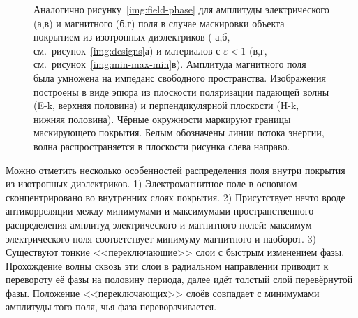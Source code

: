 \begin{figure}[p]
  \begin{minipage}[ht]{0.495\linewidth}
  \end{minipage}
  \hfill
  \begin{minipage}[ht]{0.495\linewidth}
  \end{minipage}
  \begin{minipage}[ht]{0.495\linewidth}
  \end{minipage}
  \hfill
  \begin{minipage}[ht]{0.495\linewidth}
  \end{minipage}

  \caption{Аналогично рисунку~\ref{img:field-phase} для амплитуды
    электрического (а,в) и магнитного (б,г) поля в случае маскировки
    объекта покрытием из изотропных диэлектриков ( а,б,
    см.~рисунок~\ref{img:designs}а) и материалов с
    ${\varepsilon <1}$ (в,г,
    см.~рисунок~\ref{img:min-max-min}в). Амплитуда магнитного поля
    была умножена на импеданс свободного пространства. Изображения
    построены в виде эпюра из плоскости поляризации падающей волны
    (E-k, верхняя половина) и перпендикулярной плоскости (H-k, нижняя
    половина). Чёрные окружности маркируют границы маскирующего
    покрытия. Белым обозначены линии потока энергии, волна
    распространяется в плоскости рисунка слева направо.}
  \label{img:field-amplitude}
\end{figure}

Можно отметить несколько особенностей распределения поля внутри
покрытия из изотропных диэлектриков. 1) Электромагнитное поле в
основном сконцентрировано во внутренних слоях покрытия. 2)
Присутствует нечто вроде антикорреляции между минимумами и максимумами
пространственного распределения амплитуд электрического и магнитного
полей: максимум электрического поля соответствует минимуму магнитного
и наоборот. 3) Существуют тонкие <<переключающие>> слои с быстрым
изменением фазы.  Прохождение волны сквозь эти слои в радиальном
направлении приводит к перевороту её фазы на половину периода, далее
идёт толстый слой перевёрнутой фазы.  Положение <<переключающих>>
слоёв совпадает с минимумами амплитуды того поля, чья фаза
переворачивается.

